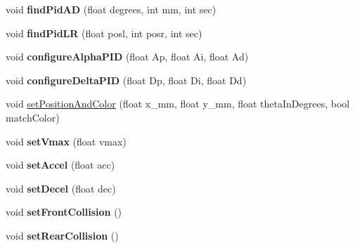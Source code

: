 \begin{DoxyCompactItemize}
\item 
\mbox{\label{classAPF9328AsservExtended_a71871107ef45ada828c09f296f7c4825}} 
void {\bfseries find\+Pid\+AD} (float degrees, int mm, int sec)
\item 
\mbox{\label{classAPF9328AsservExtended_aa9ebc38ac7438566d3a609d6953e08c1}} 
void {\bfseries find\+Pid\+LR} (float posl, int posr, int sec)
\item 
\mbox{\label{classAPF9328AsservExtended_a6aa98443067d780cd1864a3257eb0ef4}} 
void {\bfseries configure\+Alpha\+P\+ID} (float Ap, float Ai, float Ad)
\item 
\mbox{\label{classAPF9328AsservExtended_a47771f4f1c165b65e2db414788a3a69a}} 
void {\bfseries configure\+Delta\+P\+ID} (float Dp, float Di, float Dd)
\item 
void \hyperlink{classAPF9328AsservExtended_ad4c9b6504309467b4f1c820fb3202b12}{set\+Position\+And\+Color} (float x\+\_\+mm, float y\+\_\+mm, float theta\+In\+Degrees, bool match\+Color)
\item 
\mbox{\label{classAPF9328AsservExtended_a04d478f4abd9bad1669a6a2ba478f067}} 
void {\bfseries set\+Vmax} (float vmax)
\item 
\mbox{\label{classAPF9328AsservExtended_a244dc619da447c1d31c1a0b03b6207ca}} 
void {\bfseries set\+Accel} (float acc)
\item 
\mbox{\label{classAPF9328AsservExtended_a82857613a3aecd83ce40528babc565ff}} 
void {\bfseries set\+Decel} (float dec)
\item 
\mbox{\label{classAPF9328AsservExtended_aa86b14c373234f21ba44b1a6f7c4f3ed}} 
void {\bfseries set\+Front\+Collision} ()
\item 
\mbox{\label{classAPF9328AsservExtended_ae918d1c92f0f8acd25351f41d5ead8e8}} 
void {\bfseries set\+Rear\+Collision} ()
\item 
\mbox{\label{classAPF9328AsservExtended_a66af304d9d1b285594c21356bea17d49}} 

\end{DoxyCompactItemize}
